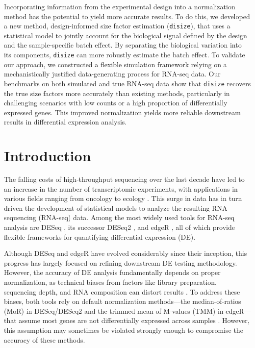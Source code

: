 \documentclass[10pt,letterpaper]{article}
\begin{document}
Incorporating information from the experimental design into a normalization method has the potential to yield more accurate results. 
To do this, we developed a new method, design-informed size factor estimation (\texttt{disize}), that uses a statistical model to jointly account for the biological signal defined by the design and the sample-specific batch effect. 
By separating the biological variation into its components, \texttt{disize} can more robustly estimate the batch effect. 
To validate our approach, we constructed a flexible simulation framework relying on a mechanistically justified data-generating process for RNA-seq data.
Our benchmarks on both simulated and true RNA-seq data show that \texttt{disize} recovers the true size factors more accurately than existing methods, particularly in challenging scenarios with low counts or a high proportion of differentially expressed genes. 
This improved normalization yields more reliable downstream results in differential expression analysis.

\linenumbers

\section*{Introduction}
The falling costs of high-throughput sequencing over the last decade have led to an increase in the number of transcriptomic experiments, with applications in various fields ranging from oncology \cite{hongRNASequencingNew2020} to ecology \cite{toddPowerPromiseRNAseq2016}. 
This surge in data has in turn driven the development of statistical models to analyze the resulting RNA sequencing (RNA-seq) data. 
Among the most widely used tools for RNA-seq analysis are DESeq \cite{andersDifferentialExpressionAnalysis2010}, its successor DESeq2 \cite{loveModeratedEstimationFold2014}, and edgeR \cite{robinsonEdgeRBioconductorPackage2010}, all of which provide flexible frameworks for quantifying differential expression (DE).

Although DESeq and edgeR have evolved considerably since their inception, this progress has largely focused on refining downstream DE testing methodology.
However, the accuracy of DE analysis fundamentally depends on proper normalization, as technical biases from factors like library preparation, sequencing depth, and RNA composition can distort results \cite{robinsonScalingNormalizationMethod2010}. 
To address these biases, both tools rely on default normalization methods---the median-of-ratios (MoR) \cite{andersDifferentialExpressionAnalysis2010} in DESeq/DESeq2 and the trimmed mean of M-values (TMM) \cite{robinsonScalingNormalizationMethod2010} in edgeR---that assume most genes are not differentially expressed across samples \cite{andersDifferentialExpressionAnalysis2010,robinsonScalingNormalizationMethod2010}. 
However, this assumption may sometimes be violated strongly enough to compromise the accuracy of these methods.
\end{document}
